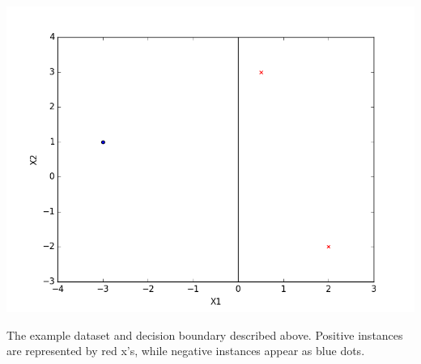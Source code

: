 \documentclass{article}
\begin{document}
\begin{center}
  \includegraphics[width=.8\textwidth]{./images/SimpleDatasetWithDecisionBoundary.png}
\end{center}
\begin{small}
  The example dataset and decision boundary described above. Positive instances are
  represented by red x's, while negative instances appear as blue dots.
\end{small}
\end{document}
